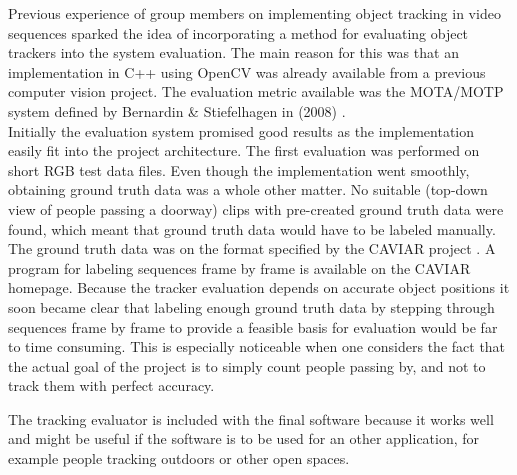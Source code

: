 
Previous experience of group members on implementing object tracking in video sequences sparked the idea of incorporating a method for evaluating object trackers into the system evaluation. The main reason for this was that an implementation in C++ using OpenCV was already available from a previous computer vision project. The evaluation metric available was the MOTA/MOTP system defined by Bernardin \& Stiefelhagen in (2008) \cite{MOTA}. \\

Initially the evaluation system promised good results as the implementation easily fit into the project architecture. The first evaluation was performed on short RGB test data files. Even though the implementation went smoothly, obtaining ground truth data was a whole other matter. No suitable (top-down view of people passing a doorway) clips with pre-created ground truth data were found, which meant that ground truth data would have to be labeled manually. The ground truth data was on the format specified by the CAVIAR project \cite{CAVIAR}. A program for labeling sequences frame by frame is available on the CAVIAR homepage. Because the tracker evaluation depends on accurate object positions it soon became clear that labeling enough ground truth data by stepping through sequences frame by frame to provide a feasible basis for evaluation would be far to time consuming. This is especially noticeable when one considers the fact that the actual goal of the project is to simply count people passing by, and not to track them with perfect accuracy.

The tracking evaluator is included with the final software because it works well and might be useful if the software is to be used for an other application, for example people tracking outdoors or other open spaces.
